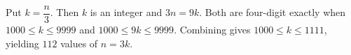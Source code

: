 Put $ k=\dfrac{n}{3}$. Then $ k $ is an integer and $ 3n=9k $. Both are four-digit exactly when $ 1000\le k\le9999 $ and $ 1000\le9k\le9999 $. Combining gives $ 1000\le k\le1111 $, yielding $\boxed{112}$ values of $ n=3k $.

